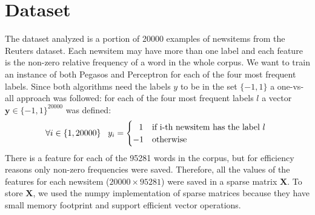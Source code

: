 \documentclass{article}
\begin{document}
\section{Dataset} \label{Dataset}
The dataset analyzed is a portion of 20000 examples of newsitems from the Reuters dataset. Each newsitem may have more than one label and each feature is the non-zero relative frequency of a word in the whole corpus. We want to train an instance of both Pegasos and Perceptron for each of the four most frequent labels. Since both algorithms need the labels $y$ to be in the set $\{-1,1\}$ a one-vs-all approach was followed: for each of the four most frequent labels $l$ a vector $\textbf{y} \in \{-1,1\}^{20000}$ was defined:
\begin{equation}
   \forall i \in \{1,20000\} \;\;\; y_i = \begin{cases}
                \; \;\,1 & $if i-th newsitem has the label $l$ $\\
                -1 & $otherwise$ \\
                \end{cases}
\end{equation}
There is a feature for each of the 95281 words in the corpus, but for efficiency reasons only non-zero frequencies were saved. Therefore, all the values of the features for each newsitem ($20000 \times 95281$) were saved in a sparse matrix $\textbf{X}$. To store $\textbf{X}$, we used the numpy implementation of sparse matrices because they have small memory footprint and support efficient vector operations.
\end{document}
